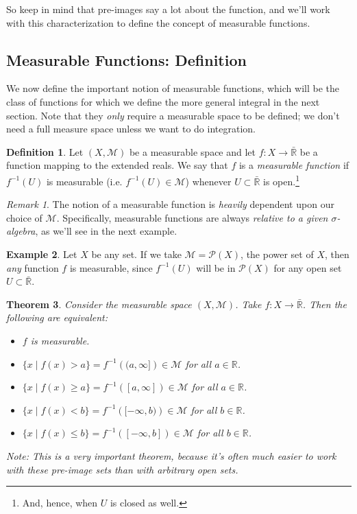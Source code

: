 \documentclass[12pt]{article}
\theoremstyle{plain}
\newtheorem{thm}{Theorem}[subsection]
\theoremstyle{definition}
\newtheorem{defn}[thm]{Definition}
\newtheorem{ex}[thm]{Example}
\theoremstyle{remark}
\newtheorem*{rmk}{Remark}
\begin{document}
So keep in mind that pre-images say a lot about the function, and we'll work with this characterization to define the concept of measurable functions.

\subsection{Measurable Functions: Definition}

We now define the important notion of measurable functions, which will be the class of functions for which we define the more general integral in the next section. Note that they \emph{only} require a measurable space to be defined; we don't need a full measure space unless we want to do integration.

\begin{defn}
Let $(X,\mathscr{M})$ be a measurable space and let $f:X\rightarrow\bar{\mathbb{R}}$ be a function mapping to the extended reals. We say that $f$ is a \emph{measurable function} if $f^{-1}(U)$ is measurable (i.e.  $f^{-1}(U)\in\mathscr{M}$) whenever $U\subset\bar{\mathbb{R}}$ is open.\footnote{And, hence, when $U$ is closed as well.} 
\end{defn}

\begin{rmk}
The notion of a measurable function is \emph{heavily} dependent upon our choice of $\mathscr{M}$.  Specifically, measurable functions are always \emph{relative to a given $\sigma$-algebra}, as we'll see in the next example.
\end{rmk}

\begin{ex}
Let $X$ be any set. If we take $\mathscr{M} = \mathscr{P}(X)$, the power set of $X$, then \emph{any} function $f$ is measurable, since $f^{-1}(U)$ will be in $\mathscr{P}(X)$ for any open set $U\subset \bar{\mathbb{R}}$.
\end{ex}

\begin{thm}
\label{measequiv}
Consider the measurable space $(X,\mathscr{M})$. Take $f:X\rightarrow\bar{\mathbb{R}}$. Then the following are equivalent:
\begin{itemize}
    \item $f$ is measurable.

    \item $\{x \; | \; f(x) > a\} = f^{-1}\left((a,\infty]\right)\in\mathscr{M}$ for all $a\in\mathbb{R}$. 

    \item $\{x \; | \; f(x) \geq a\} = f^{-1}\left([a,\infty]\right)\in\mathscr{M}$ for all $a\in\mathbb{R}$. 

    \item $\{x \; | \; f(x) < b\} = f^{-1}\left([-\infty,b)\right)\in\mathscr{M}$ for all $b\in\mathbb{R}$. 

    \item $\{x \; | \; f(x) \leq b\} = f^{-1}\left([-\infty,b]\right)\in\mathscr{M}$ for all $b\in\mathbb{R}$. 
\end{itemize}
Note: \emph{This is a \emph{very} important theorem, because it's often much easier to work with these pre-image sets than with arbitrary open sets.}
\end{thm}
\end{document}
